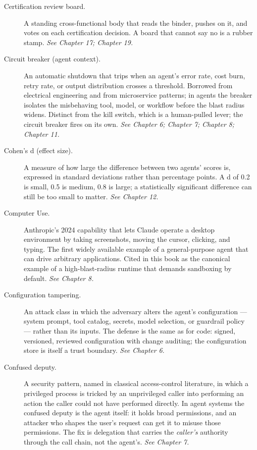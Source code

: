 \begin{description}
  \item[Certification review board.] A standing cross-functional body that reads the binder, pushes on it, and votes on each certification decision. A board that cannot say no is a rubber stamp. \textit{See Chapter 17; Chapter 19.}
  \item[Circuit breaker (agent context).] An automatic shutdown that trips when an agent's error rate, cost burn, retry rate, or output distribution crosses a threshold. Borrowed from electrical engineering and from microservice patterns; in agents the breaker isolates the misbehaving tool, model, or workflow before the blast radius widens. Distinct from the kill switch, which is a human-pulled lever; the circuit breaker fires on its own. \textit{See Chapter 6; Chapter 7; Chapter 8; Chapter 11.}
  \item[Cohen's d (effect size).] A measure of how large the difference between two agents' scores is, expressed in standard deviations rather than percentage points. A d of 0.2 is small, 0.5 is medium, 0.8 is large; a statistically significant difference can still be too small to matter. \textit{See Chapter 12.}
  \item[Computer Use.] Anthropic's 2024 capability that lets Claude operate a desktop environment by taking screenshots, moving the cursor, clicking, and typing. The first widely available example of a general-purpose agent that can drive arbitrary applications. Cited in this book as the canonical example of a high-blast-radius runtime that demands sandboxing by default. \textit{See Chapter 8.}
  \item[Configuration tampering.] An attack class in which the adversary alters the agent's configuration — system prompt, tool catalog, secrets, model selection, or guardrail policy — rather than its inputs. The defense is the same as for code: signed, versioned, reviewed configuration with change auditing; the configuration store is itself a trust boundary. \textit{See Chapter 6.}
  \item[Confused deputy.] A security pattern, named in classical access-control literature, in which a privileged process is tricked by an unprivileged caller into performing an action the caller could not have performed directly. In agent systems the confused deputy is the agent itself: it holds broad permissions, and an attacker who shapes the user's request can get it to misuse those permissions. The fix is delegation that carries the \textit{caller's} authority through the call chain, not the agent's. \textit{See Chapter 7.}

\end{description}
